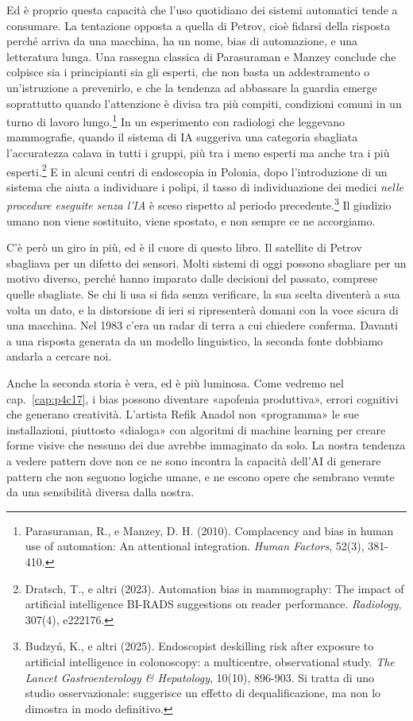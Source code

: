 Ed è proprio questa capacità che l'uso quotidiano dei sistemi automatici tende a consumare. La tentazione opposta a quella di Petrov, cioè fidarsi della risposta perché arriva da una macchina, ha un nome, bias di automazione, e una letteratura lunga. Una rassegna classica di Parasuraman e Manzey conclude che colpisce sia i principianti sia gli esperti, che non basta un addestramento o un'istruzione a prevenirlo, e che la tendenza ad abbassare la guardia emerge soprattutto quando l'attenzione è divisa tra più compiti, condizioni comuni in un turno di lavoro lungo.\footnote{Parasuraman, R., e Manzey, D. H. (2010). Complacency and bias in human use of automation: An attentional integration. \textit{Human Factors}, 52(3), 381-410.} In un esperimento con radiologi che leggevano mammografie, quando il sistema di IA suggeriva una categoria sbagliata l'accuratezza calava in tutti i gruppi, più tra i meno esperti ma anche tra i più esperti.\footnote{Dratsch, T., e altri (2023). Automation bias in mammography: The impact of artificial intelligence BI-RADS suggestions on reader performance. \textit{Radiology}, 307(4), e222176.} E in alcuni centri di endoscopia in Polonia, dopo l'introduzione di un sistema che aiuta a individuare i polipi, il tasso di individuazione dei medici \textit{nelle procedure eseguite senza l'IA} è sceso rispetto al periodo precedente.\footnote{Budzyń, K., e altri (2025). Endoscopist deskilling risk after exposure to artificial intelligence in colonoscopy: a multicentre, observational study. \textit{The Lancet Gastroenterology \& Hepatology}, 10(10), 896-903. Si tratta di uno studio osservazionale: suggerisce un effetto di dequalificazione, ma non lo dimostra in modo definitivo.} Il giudizio umano non viene sostituito, viene spostato, e non sempre ce ne accorgiamo.

C'è però un giro in più, ed è il cuore di questo libro. Il satellite di Petrov sbagliava per un difetto dei sensori. Molti sistemi di oggi possono sbagliare per un motivo diverso, perché hanno imparato dalle decisioni del passato, comprese quelle sbagliate. Se chi li usa si fida senza verificare, la sua scelta diventerà a sua volta un dato, e la distorsione di ieri si ripresenterà domani con la voce sicura di una macchina. Nel 1983 c'era un radar di terra a cui chiedere conferma. Davanti a una risposta generata da un modello linguistico, la seconda fonte dobbiamo andarla a cercare noi.

Anche la seconda storia è vera, ed è più luminosa. Come vedremo nel cap.~\ref{cap:p4c17}, i bias possono diventare «apofenia produttiva», errori cognitivi che generano creatività. L'artista Refik Anadol non «programma» le sue installazioni, piuttosto «dialoga» con algoritmi di machine learning per creare forme visive che nessuno dei due avrebbe immaginato da solo. La nostra tendenza a vedere pattern dove non ce ne sono incontra la capacità dell'AI di generare pattern che non seguono logiche umane, e ne escono opere che sembrano venute da una sensibilità diversa dalla nostra.

